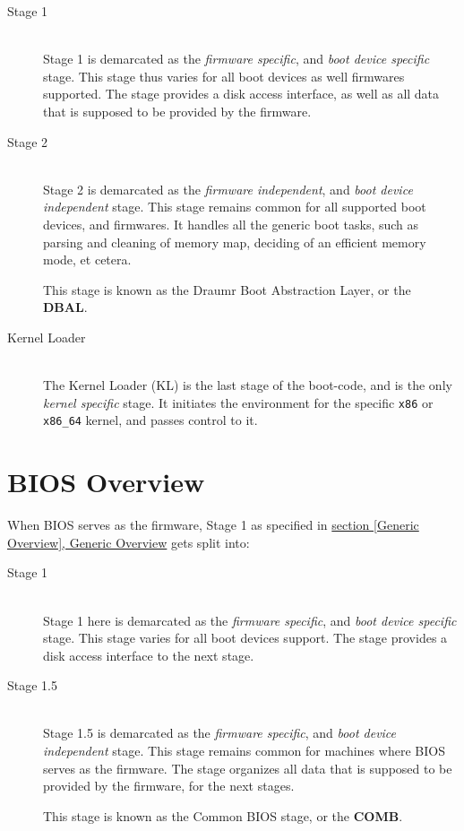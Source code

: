 \documentclass[11pt,a4paper,oneside]{report}
\begin{document}
\begin{description}
    \item[Stage 1] \hfill \\
                    Stage 1 is demarcated as the \emph{firmware specific}, and \emph{boot device specific} stage. This stage thus varies for all boot devices as well firmwares supported. The stage provides a disk access interface, as well as all data that is supposed to be provided by the firmware.

    \item[Stage 2] \hfill \\
                    Stage 2 is demarcated as the \emph{firmware independent}, and \emph{boot device independent} stage. This stage remains common for all supported boot devices, and firmwares. It handles all the generic boot tasks, such as parsing and cleaning of memory map, deciding of an efficient memory mode, et cetera. 

                    This stage is known as the Draumr Boot Abstraction Layer, or the \textbf{DBAL}.

    \item[Kernel Loader] \hfill \\
                    The Kernel Loader (KL) is the last stage of the boot-code, and is the only \emph{kernel specific} stage. It initiates the environment for the specific \texttt{x86} or \texttt{x86\_64} kernel, and passes control to it.
\end{description}

\section{BIOS Overview}

When BIOS serves as the firmware, Stage 1 as specified in \hyperref[Generic Overview]{section \ref*{Generic Overview}, Generic Overview} gets split into:

\begin{description}
    \item[Stage 1] \hfill \\
                    Stage 1 here is demarcated as the \emph{firmware specific}, and \emph{boot device specific} stage. This stage varies for all boot devices support. The stage provides a disk access interface to the next stage.
    \item[Stage 1.5] \hfill \\
                    Stage 1.5 is demarcated as the \emph{firmware specific}, and \emph{boot device independent} stage. This stage remains common for machines where BIOS serves as the firmware. The stage organizes all data that is supposed to be provided by the firmware, for the next stages.

                    This stage is known as the Common BIOS stage, or the \textbf{COMB}.
\end{description}
\end{document}
